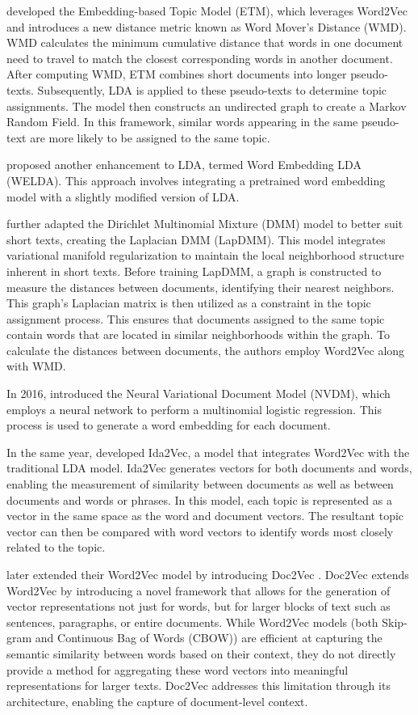 \documentclass{article}
\begin{document}
\citet{qiang_topic_2017} developed the Embedding-based Topic Model (ETM), which leverages Word2Vec and introduces a new distance metric known as Word Mover's Distance (WMD). WMD calculates the minimum cumulative distance that words in one document need to travel to match the closest corresponding words in another document. After computing WMD, ETM combines short documents into longer pseudo-texts. Subsequently, LDA is applied to these pseudo-texts to determine topic assignments. The model then constructs an undirected graph to create a Markov Random Field. In this framework, similar words appearing in the same pseudo-text are more likely to be assigned to the same topic.

\citet{bunk_welda_2018} proposed another enhancement to LDA, termed Word Embedding LDA (WELDA). This approach involves integrating a pretrained word embedding model with a slightly modified version of LDA.

\citet{li_dirichlet_2019} further adapted the Dirichlet Multinomial Mixture (DMM) model to better suit short texts, creating the Laplacian DMM (LapDMM). This model integrates variational manifold regularization to maintain the local neighborhood structure inherent in short texts. Before training LapDMM, a graph is constructed to measure the distances between documents, identifying their nearest neighbors. This graph's Laplacian matrix is then utilized as a constraint in the topic assignment process. This ensures that documents assigned to the same topic contain words that are located in similar neighborhoods within the graph. To calculate the distances between documents, the authors employ Word2Vec along with WMD.

In 2016, \citet{miao_neural_2016} introduced the Neural Variational Document Model (NVDM), which employs a neural network to perform a multinomial logistic regression. This process is used to generate a word embedding for each document.

In the same year, \citet{moody_mixing_2016} developed Ida2Vec, a model that integrates Word2Vec with the traditional LDA model. Ida2Vec generates vectors for both documents and words, enabling the measurement of similarity between documents as well as between documents and words or phrases. In this model, each topic is represented as a vector in the same space as the word and document vectors. The resultant topic vector can then be compared with word vectors to identify words most closely related to the topic.

\citeauthor{le_distributed_2014} later extended their Word2Vec model by introducing Doc2Vec \cite{le_distributed_2014}. Doc2Vec extends Word2Vec by introducing a novel framework that allows for the generation of vector representations not just for words, but for larger blocks of text such as sentences, paragraphs, or entire documents. While Word2Vec models (both Skip-gram and Continuous Bag of Words (CBOW)) are efficient at capturing the semantic similarity between words based on their context, they do not directly provide a method for aggregating these word vectors into meaningful representations for larger texts. Doc2Vec addresses this limitation through its architecture, enabling the capture of document-level context.
\end{document}
